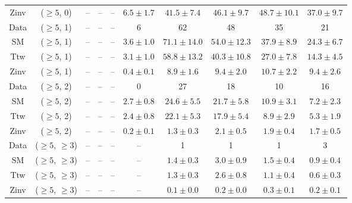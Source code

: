 \begin{table}[h!]
{\begin{tabular}{cccccccccc}
	Zinv & ($\ge5$, 0) & -- & -- & -- & $6.5\pm 1.7$ & $41.5\pm 7.4$ & $46.1\pm 9.7$ & $48.7\pm 10.1$ & $37.0\pm 9.7$ \\[0.5ex] 
	Data & ($\ge5$, 1) & -- & -- & -- & 6 & 62 & 48 & 35 & 21 \\[0.5ex] 
	SM & ($\ge5$, 1) & -- & -- & -- & $3.6\pm 1.0$ & $71.1\pm 14.0$ & $54.0\pm 12.3$ & $37.9\pm 8.9$ & $24.3\pm 6.7$ \\[0.5ex] 
	Ttw & ($\ge5$, 1) & -- & -- & -- & $3.1\pm 1.0$ & $58.8\pm 13.2$ & $40.3\pm 10.8$ & $27.0\pm 7.8$ & $14.3\pm 4.5$ \\[0.5ex] 
	Zinv & ($\ge5$, 1) & -- & -- & -- & $0.4\pm 0.1$ & $8.9\pm 1.6$ & $9.4\pm 2.0$ & $10.7\pm 2.2$ & $9.4\pm 2.6$ \\[0.5ex] 
	Data & ($\ge5$, 2) & -- & -- & -- & 0 & 27 & 18 & 10 & 16 \\[0.5ex] 
	SM & ($\ge5$, 2) & -- & -- & -- & $2.7\pm 0.8$ & $24.6\pm 5.5$ & $21.7\pm 5.8$ & $10.9\pm 3.1$ & $7.2\pm 2.3$ \\[0.5ex] 
	Ttw & ($\ge5$, 2) & -- & -- & -- & $2.4\pm 0.8$ & $22.1\pm 5.3$ & $17.9\pm 5.4$ & $8.9\pm 2.9$ & $5.3\pm 1.9$ \\[0.5ex] 
	Zinv & ($\ge5$, 2) & -- & -- & -- & $0.2\pm 0.1$ & $1.3\pm 0.3$ & $2.1\pm 0.5$ & $1.9\pm 0.4$ & $1.7\pm 0.5$ \\[0.5ex] 
	Data & ($\ge5$, $\ge3$) & -- & -- & -- & -- & 1 & 1 & 1 & 3 \\[0.5ex] 
	SM & ($\ge5$, $\ge3$) & -- & -- & -- & -- & $1.4\pm 0.3$ & $3.0\pm 0.9$ & $1.5\pm 0.4$ & $0.9\pm 0.4$ \\[0.5ex] 
	Ttw & ($\ge5$, $\ge3$) & -- & -- & -- & -- & $1.3\pm 0.3$ & $2.6\pm 0.8$ & $1.1\pm 0.4$ & $0.6\pm 0.3$ \\[0.5ex] 
	Zinv & ($\ge5$, $\ge3$) & -- & -- & -- & -- & $0.1\pm 0.0$ & $0.2\pm 0.0$ & $0.3\pm 0.1$ & $0.2\pm 0.1$ \\[0.5ex] 
	\hline
	\hline
\end{tabular}}
\end{table}

